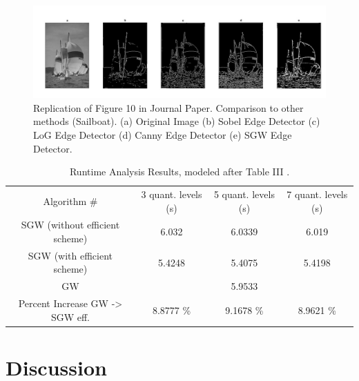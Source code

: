 \documentclass[./rarnold_final_project.tex]{subfiles}
\begin{document}
	\begin{figure}[!htbp]
	\centering
	\includegraphics[scale=0.35]{"sailboat"}
	\captionsetup{justification=centering}
	\caption{Replication of Figure 10 in Journal Paper. Comparison to other methods (Sailboat). (a) Original Image (b) Sobel Edge Detector (c) LoG Edge Detector (d) Canny Edge Detector (e) SGW Edge Detector. \cite{main}} 
	\label{sailboat}
	\end{figure}
	
	\clearpage
	
\begin{table}[htbp]
\centering
\caption{Runtime Analysis Results, modeled after Table III \cite{main}.}
\label{runtime}
\begin{tabular}{|c|c|c|c|}
\hline
Algorithm \# & 3 quant. levels (s)& 5 quant. levels (s) & 7 quant. levels (s)\\ \hhline{|=|=|=|=|}
SGW (without efficient scheme)& 6.032 & 6.0339 & 6.019\\ \hline
SGW (with efficient scheme)& 5.4248 & 5.4075 & 5.4198\\ \hline
GW& \multicolumn{3}{c|}{5.9533} \\ \hline
Percent Increase GW -> SGW eff.& 8.8777 \% & 9.1678 \% & 8.9621 \% \\ \hline
\end{tabular}
\end{table}	

\section{Discussion}
\end{document}
